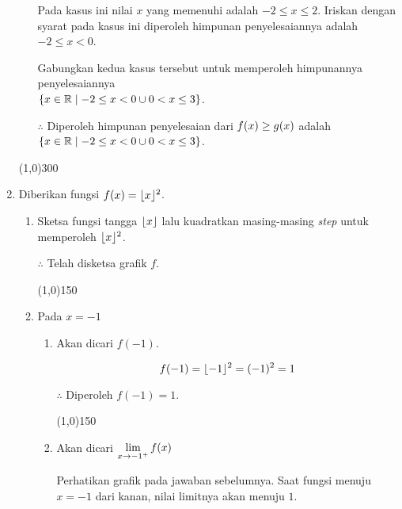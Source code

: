 \begin{enumerate}[leftmargin=*, label={\arabic*}.]
\begin{enumerate}[label={\alph*}.]
    
    
    Pada kasus ini nilai $x$ yang memenuhi adalah $-2 \leq x \leq 2$. Iriskan dengan syarat 
    pada kasus ini diperoleh himpunan penyelesaiannya adalah $-2 \leq x < 0$.

    Gabungkan kedua kasus tersebut untuk memperoleh himpunannya penyelesaiannya \\
    $\set*{x \in \mathbb{R} \mid -2 \leq x < 0 \cup 0 < x \leq 3}$.

    $\therefore$ Diperoleh himpunan penyelesaian dari $\ds f(x) \geq g(x)$ adalah 
    $\set*{x \in \mathbb{R} \mid -2 \leq x < 0 \cup 0 < x \leq 3}$.

    \end{enumerate}


\begin{center}\line(1,0){300}\end{center}


\item Diberikan fungsi $f(x) = \floor{x}^2$.
    \begin{enumerate}[label={\alph*}.]
    \item Sketsa fungsi tangga $\floor{x}$ lalu kuadratkan masing-masing \textit{step} 
    untuk memperoleh $\floor{x}^{2}$.

    
    

    $\therefore$ Telah disketsa grafik $f$.


\begin{center}\line(1,0){150}\end{center}


    \item Pada $x=-1$ 
        \begin{enumerate}[label={\roman*}.]
        \item Akan dicari $f(-1)$.

        \[
        f(-1) = \floor{-1}^{2} = (-1)^{2} = 1
        \]

        $\therefore$ Diperoleh $f(-1)=1$.


\begin{center}\line(1,0){150}\end{center}


        \item Akan dicari $\ds\lim_{x\to -1^{+}} f(x)$
        
        Perhatikan grafik pada jawaban sebelumnya. Saat fungsi menuju $x=-1$ dari kanan, nilai 
        limitnya akan menuju $1$.


\end{enumerate}
\end{enumerate}
\end{enumerate}
